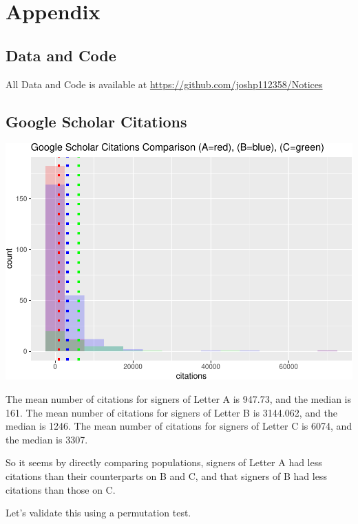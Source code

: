 \documentclass[]{article}
\begin{document}
\hypertarget{appendix}{%
\section{Appendix}\label{appendix}}

\hypertarget{data-and-code}{%
\subsection{Data and Code}\label{data-and-code}}

All Data and Code is available at
\url{https://github.com/joshp112358/Notices}

\hypertarget{google-scholar-citations}{%
\subsection{Google Scholar Citations}\label{google-scholar-citations}}

\includegraphics{final_files/figure-latex/unnamed-chunk-56-1.pdf}

The mean number of citations for signers of Letter A is 947.73, and the
median is 161. The mean number of citations for signers of Letter B is
3144.062, and the median is 1246. The mean number of citations for
signers of Letter C is 6074, and the median is 3307.

So it seems by directly comparing populations, signers of Letter A had
less citations than their counterparts on B and C, and that signers of B
had less citations than those on C.

Let's validate this using a permutation test.
\end{document}
